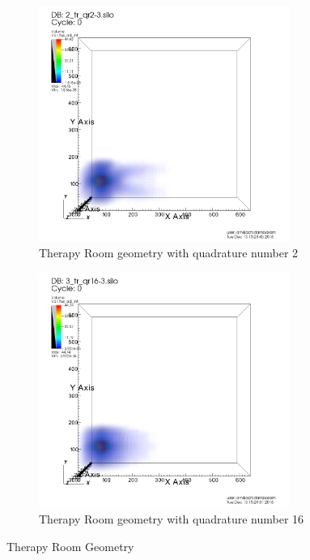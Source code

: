 \documentclass[10pt]{article}
\begin{document}
\begin{figure}[!ht]
\centering
\begin{subfigure}{0.49\textwidth}
\centering
\includegraphics[width = 0.9\textwidth]{visit/visit-therapy-room-02}
\caption{Therapy Room geometry with quadrature number 2}
\label{visit:therapy-room-02}
\end{subfigure}
\hfill
\begin{subfigure}{0.49\textwidth}
\centering
\includegraphics[width = 0.9\textwidth]{visit/visit-therapy-room-16}
\caption{Therapy Room geometry with quadrature number 16}
\label{visit:therapy-room-16}
\end{subfigure}
\caption{Therapy Room Geometry}
\label{visit:therapy-room}
\end{figure}
\end{document}
